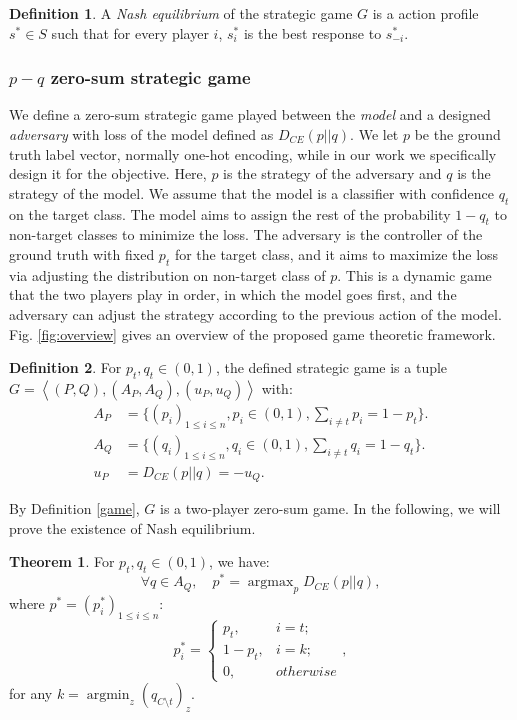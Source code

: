 \documentclass{article}
\theoremstyle{definition}
\newtheorem{definition}{Definition}
\newtheorem{theorem}{Theorem}
\begin{document}
\begin{definition} \label{nash}
A \textit{Nash equilibrium} of the strategic game $G$ is a action profile $s^{*} \in S$ such that for every player $i$, $s^{*}_{i}$ is the best response to $s^{*}_{-i}$.
\end{definition}

\subsubsection{$p-q$ zero-sum strategic game}
We define a zero-sum strategic game played between the \emph{model} and a designed \emph{adversary} with loss of the model defined as $D_{CE} (p||q)$. 
 We let $p$ be the ground truth label vector, normally one-hot encoding, while in our work we specifically design it for the objective.
Here, $p$ is the strategy of the adversary and $q$ is the strategy of the model. We assume that the model is a classifier with confidence $q_{t}$ on the target class. The model aims to assign the rest of the probability $1-q_{t}$ to non-target classes to minimize the loss. The adversary is the controller of the ground truth with fixed $p_{t}$ for the target class, and it aims to maximize the loss via adjusting the distribution on non-target class of $p$. This is a dynamic game that the two players play in order, in which the model goes first, and the adversary can adjust the strategy according to the previous action of the model. Fig. \ref{fig:overview} gives an overview of the proposed game theoretic framework.

\begin{definition}
For $p_t, q_t \in (0, 1)$, the defined strategic game is a tuple $G=\left \langle(P,Q),(A_P,A_Q), (u_P,u_Q)\right \rangle$ with:
\begin{align}\nonumber
    A_P &= \{(p_i)_{1\leq i \leq n}, p_i \in (0,1), \sum_{i \neq t}p_i = 1-p_t \}.\\\nonumber
     A_Q& = \{(q_i)_{1\leq i \leq n}, q_i \in (0,1), \sum_{i \neq t}q_i = 1-q_t \}.\\\nonumber
     u_P&=D_{CE} (p||q) = -u_Q.
\end{align}
\end{definition}

By Definition \ref{game}, $G$ is a two-player zero-sum game. In the following, we will prove the existence of Nash equilibrium.
\begin{theorem} \label{adversary}
For $p_t, q_t \in (0, 1)$, we have:
\begin{equation}\nonumber
  \forall q \in A_Q, \quad p^* = \mathop{\arg\max}_{p} D_{CE}(p||q),
\end{equation}
where $p^* = (p_i^*)_{1\leq i \leq n}$: 
\begin{equation}\nonumber
      p_i^* =
      \begin{cases}
        p_t, & i = t; \\
    	1-p_t, & i = k; \\
    	0, & otherwise
      \end{cases},
\end{equation}
for any $k =  \mathop{\arg\min}_z (q_{C\setminus t})_z$.

\end{theorem}
\end{document}
